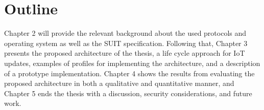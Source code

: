 \documentclass[0-thesis.tex]{subfiles}
\begin{document}
\section{Outline}
\label{sec:outline}
Chapter 2 will provide the relevant background about the used protocols and operating
system as well as the SUIT specification. Following that, Chapter 3 presents the proposed
architecture of the thesis, a life cycle approach for IoT updates, examples of profiles
for implementing the architecture, and a description of a prototype implementation.
Chapter 4 shows the results from evaluating the proposed architecture in both a
qualitative and quantitative manner, and Chapter 5 ends the thesis with a discussion,
security considerations, and future work.
\end{document}
